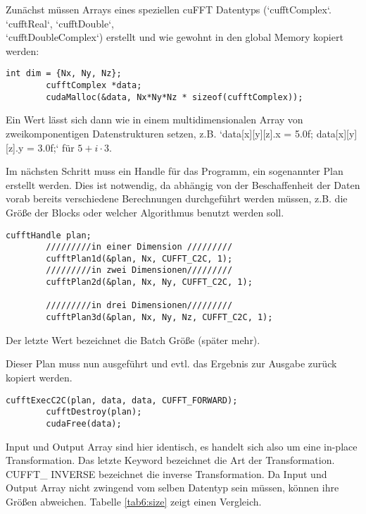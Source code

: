 		Zunächst müssen Arrays eines speziellen cuFFT Datentyps (\li`cufftComplex`. \li`cufftReal`, \li`cufftDouble`,\\
		\li`cufftDoubleComplex`) erstellt und wie gewohnt in den \gls{global Memory} kopiert werden:
		
		\begin{lstlisting}[caption=cuFFT: komplexer Datentyp]
		int dim = {Nx, Ny, Nz};
		cufftComplex *data;
		cudaMalloc(&data, Nx*Ny*Nz * sizeof(cufftComplex));
		\end{lstlisting}
		
		Ein Wert lässt sich dann wie in einem multidimensionalen Array von zweikomponentigen Datenstrukturen setzen, z.B. \li`data[x][y][z].x = 5.0f; data[x][y][z].y = 3.0f;` für $5 + i\cdot 3$.
	
		Im nächsten Schritt muss ein \Gls{Handle} für das Programm, ein sogenannter Plan erstellt werden. Dies ist notwendig, da abhängig von der Beschaffenheit der Daten vorab bereits verschiedene Berechnungen durchgeführt werden müssen, z.B. die Größe der \Glspl{Block} oder welcher Algorithmus benutzt werden soll. 
		
		\begin{lstlisting}[caption=cuFFT: Pläne]
		cufftHandle plan;
		/////////in einer Dimension /////////
		cufftPlan1d(&plan, Nx, CUFFT_C2C, 1);	
		/////////in zwei Dimensionen/////////
		cufftPlan2d(&plan, Nx, Ny, CUFFT_C2C, 1);	
						
		/////////in drei Dimensionen/////////
		cufftPlan3d(&plan, Nx, Ny, Nz, CUFFT_C2C, 1);
		\end{lstlisting}
		
		Der letzte Wert bezeichnet die Batch Größe (später mehr).
	    
		Dieser Plan muss nun ausgeführt und evtl. das Ergebnis zur Ausgabe zurück kopiert werden.
		
		\begin{lstlisting}[caption=cuFFT: Ausführen]
		cufftExecC2C(plan, data, data, CUFFT_FORWARD);
		cufftDestroy(plan);
		cudaFree(data);
		\end{lstlisting}
		
		Input und Output Array sind hier identisch, es handelt sich also um eine in-place Transformation. Das letzte Keyword bezeichnet die Art der Transformation. CUFFT\_ INVERSE bezeichnet die inverse Transformation. Da Input und Output Array nicht zwingend vom selben Datentyp sein müssen, können ihre Größen abweichen. Tabelle \ref{tab6:size} zeigt einen Vergleich.
		
